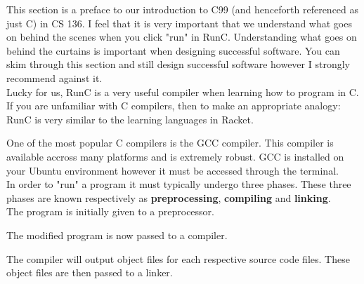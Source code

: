 
This section is a preface to our introduction to C99 (and henceforth referenced as just C) in CS 136. I feel that it is very important that we understand what goes on behind the scenes when you click "run" in RunC. Understanding what goes on behind the curtains is important when designing successful software. You can skim through this section and still design successful software however I strongly recommend against it.\\

Lucky for us, RunC is a very useful compiler when learning how to program in C. If you are unfamiliar with C compilers, then to make an appropriate analogy: RunC is very similar to the learning languages in Racket.\\


One of the most popular C compilers is the GCC compiler. This compiler is available accross many platforms and is extremely robust. GCC is installed on your Ubuntu environment however it must be accessed through the terminal.\\

In order to "run" a program it must typically undergo three phases. These three phases are known respectively as \textbf{preprocessing}, \textbf{compiling} and \textbf{linking}.\\

The program is initially given to a preprocessor.\\


The modified program is now passed to a compiler.\\


The compiler will output object files for each respective source code files. These object files are then passed to a linker.\\


